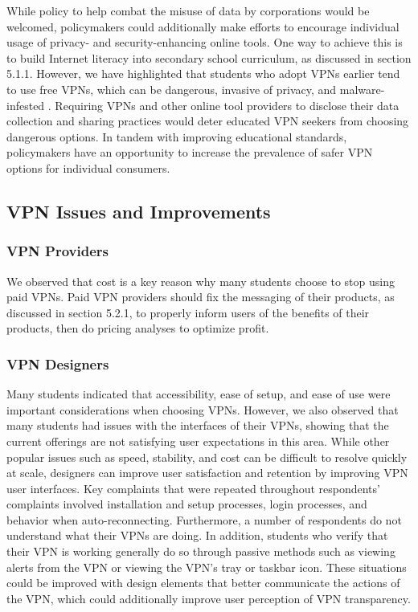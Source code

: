 While policy to help combat the misuse of data by corporations would be
welcomed, policymakers could additionally make efforts to encourage individual
usage of privacy- and security-enhancing online tools. One way to achieve this
is to build Internet literacy into secondary school curriculum, as discussed
in section 5.1.1. However, we have highlighted that students who adopt VPNs
earlier tend to use free VPNs, which can be dangerous, invasive of privacy,
and malware-infested \cite{taylor_7}. Requiring VPNs and other online tool providers to
disclose their data collection and sharing practices would deter educated VPN
seekers from choosing dangerous options. In tandem with improving educational
standards, policymakers have an opportunity to increase the prevalence of
safer VPN options for individual consumers.

\subsection{VPN Issues and Improvements} \subsubsection{VPN Providers}

We observed that cost is a key reason why many students choose to stop using
paid VPNs. Paid VPN providers should fix the messaging of their products, as
discussed in section 5.2.1, to properly inform users of the benefits of their
products, then do pricing analyses to optimize profit.

\subsubsection{VPN Designers}

Many students indicated that accessibility, ease of setup, and ease of use
were important considerations when choosing VPNs. However, we also observed
that many students had issues with the interfaces of their VPNs, showing that
the current offerings are not satisfying user expectations in this area. While
other popular issues such as speed, stability, and cost can be difficult to
resolve quickly at scale, designers can improve user satisfaction and
retention by improving VPN user interfaces. Key complaints that were repeated
throughout respondents’ complaints involved installation and setup processes,
login processes, and behavior when auto-reconnecting. Furthermore, a number of
respondents do not understand what their VPNs are doing. In addition, students
who verify that their VPN is working generally do so through passive methods
such as viewing alerts from the VPN or viewing the VPN’s tray or taskbar icon.
These situations could be improved with design elements that better
communicate the actions of the VPN, which could additionally improve user
perception of VPN transparency.

